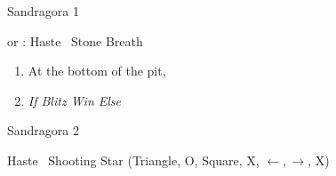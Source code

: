 \begin{battle}{Sandragora 1}
  \begin{itemize}
    \switch{\tidus}{\kimahri} or \tidus: Haste \kimahri
    \kimahrif \od\ Stone Breath
  \end{itemize}
\end{battle}
\begin{enumerate}[resume]
\item At the bottom of the pit, 
\item \formation{\tidus}{\lulu}{\auron} \textit{If Blitz Win Else} \formation{\tidus}{\rikku}{\auron}
\end{enumerate}
\begin{battle}{Sandragora 2}
  \begin{itemize}
    \tidusf Haste \auron
    \auronf \od\ Shooting Star (Triangle, O, Square, X, $\leftarrow, \rightarrow$, X)
  \end{itemize}
\end{battle}